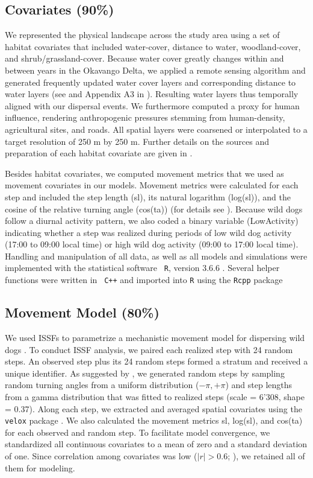 \documentclass[abstract=on,10pt,a4paper,bibliography=totocnumbered]{article}
\begin{document}
\subsection{Covariates (90\%)}
We represented the physical landscape across the study area using a set of
habitat covariates that included water-cover, distance to water, woodland-cover,
and shrub/grassland-cover. Because water cover greatly changes within and
between years in the Okavango Delta, we applied a remote sensing algorithm and
generated frequently updated water cover layers and corresponding distance to
water layers (see \citealp{Wolski.2017} and Appendix A3 in
\citealp{Hofmann.2021}). Resulting water layers thus temporally aligned with our
dispersal events. We furthermore computed a proxy for human influence, rendering
anthropogenic pressures stemming from human-density, agricultural sites, and
roads. All spatial layers were coarsened or interpolated to a target resolution
of 250 m by 250 m. Further details on the sources and preparation of each
habitat covariate are given in \cite{Hofmann.2021}.

Besides habitat covariates, we computed movement metrics that we used as
movement covariates in our models. Movement metrics were calculated for each
step and included the step length (\textsf{sl}), its natural logarithm
(\textsf{log(sl)}), and the cosine of the relative turning angle
(\textsf{cos(ta)}) (for details see \citep{Avgar.2016, Fieberg.2020}). Because
wild dogs follow a diurnal activity pattern, we also coded a binary variable
(\textsf{LowActivity}) indicating whether a step was realized during periods of
low wild dog activity (17:00 to 09:00 local time) or high wild dog activity
(09:00 to 17:00 local time). Handling and manipulation of all data, as well as
all models and simulations were implemented with the statistical software {\tt
R}, version 3.6.6 \citep{R.2019}. Several helper functions were written in {\tt
C++} and imported into {\tt R} using the {\tt Rcpp} package
\citep{Eddelbuettel.2011, Eddelbuettel.2013}

\subsection{Movement Model (80\%)}
We used ISSFs to parametrize a mechanistic movement model for dispersing wild
dogs \citep{Avgar.2016}. To conduct ISSF analysis, we paired each realized step
with 24 random steps. An observed step plus its 24 random steps formed a stratum
and received a unique identifier. As suggested by \cite{Avgar.2016}, we
generated random steps by sampling random turning angles from a uniform
distribution (\(-\pi, +\pi\)) and step lengths from a gamma distribution that
was fitted to realized steps (scale = 6'308, shape = 0.37). Along each step, we
extracted and averaged spatial covariates using the {\tt velox} package
\citep{Hunziker.2021}. We also calculated the movement metrics \textsf{sl},
\textsf{log(sl)}, and \textsf{cos(ta)} for each observed and random step. To
facilitate model convergence, we standardized all continuous covariates to a
mean of zero and a standard deviation of one. Since correlation among covariates
was low (\(|r| > 0.6\); \citealp{Latham.2011}), we retained all of them for
modeling.
\end{document}

